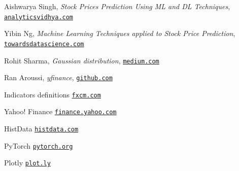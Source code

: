 \documentclass[a4paper,12pt]{article}
\begin{document}
\pagebreak
\begin{thebibliography}{15}
	
Aishwarya Singh, \textit{Stock Prices Prediction Using ML and DL Techniques},
\texttt{\href{https://www.analyticsvidhya.com/blog/2018/10/predicting-stock-price-machine-learningnd-deep-learning-techniques-python/}{analyticsvidhya.com}}

Yibin Ng, \textit{Machine Learning Techniques applied to Stock Price Prediction}, \texttt{\href{https://towardsdatascience.com/machine-learning-techniques-applied-to-stock-price-prediction-6c1994da8001}{towardsdatascience.com}}

Rohit Sharma, \textit{Gaussian distribution}, \texttt{\href{https://medium.com/ai-techsystems/gaussian-distribution-why-is-it-important-in-data-science-and-machine-learning-9adbe0e5f8ac}{medium.com}}


Ran Aroussi, \textit{yfinance}, \texttt{\href{https://github.com/ranaroussi/yfinance}{github.com}}

Indicators definitions
\texttt{\href{https://www.fxcm.com/uk/insights/learn-forex-oscillators-and-momentum-indicators/}{fxcm.com}}

Yahoo! Finance
\texttt{\href{https://finance.yahoo.com}{finance.yahoo.com}}

HistData
\texttt{\href{http://histdata.com}{histdata.com}}

PyTorch
\texttt{\href{https://pytorch.org/}{pytorch.org}}

Plotly
\texttt{\href{https://plot.ly/javascript/}{plot.ly}}

\end{thebibliography}
\end{document}

